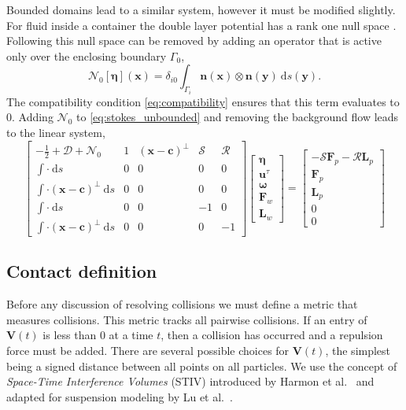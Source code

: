 \documentclass[preprint, 10pt]{elsarticle}
\begin{document}
Bounded domains lead to a similar system, however it must be modified slightly. For fluid inside a container the double layer potential has a rank one null space \cite{Ladyzhenskaya1963}. Following \cite{Power1993} this null space can be removed by adding an operator that is active only over the enclosing boundary $\Gamma_0$,
\[ \mathcal{N}_0[\pmb{\eta}](\mathbf{x}) = \delta_{i0} \int_{\Gamma_i}\mathbf{n}(\mathbf{x})\otimes\mathbf{n}(\mathbf{y})~\text{d}s(\mathbf{y}).\]
The compatibility condition \eqref{eq:compatibility} ensures that this term evaluates to 0. Adding $\mathcal{N}_0$ to \eqref{eq:stokes_unbounded} and removing the background flow leads to the linear system,
\begin{equation}\label{eq:stokes_bounded} \begin{bmatrix} -\frac{1}{2} + \mathcal{D} + \mathcal{N}_0 & 1 & (\mathbf{x}-\mathbf{c})^\perp & \mathcal{S} & \mathcal{R}\\
		\int \cdot~ \text{d}s & 0 & 0 & 0 & 0\\
		\int\cdot(\mathbf{x}-\mathbf{c})^\perp~\text{d}s & 0 & 0 & 0 & 0\\
		\int \cdot~ \text{d}s & 0 & 0 & - 1 & 0\\
		\int\cdot(\mathbf{x}-\mathbf{c})^\perp~\text{d}s & 0 & 0 & 0 & -1\end{bmatrix}
\begin{bmatrix}
	\pmb{\eta}\\\mathbf{u}^\tau \\ \pmb{\omega} \\ \mathbf{F}_w \\\mathbf{ L}_w
\end{bmatrix}
=
\begin{bmatrix}
	 - \mathcal{S}\mathbf{F}_p - \mathcal{R}\mathbf{L}_p\\
	\mathbf{F}_p\\
	\mathbf{L}_p\\
	0\\
	0
\end{bmatrix}
\end{equation}

\subsection{Contact definition}

Before any discussion of resolving collisions we must define a metric that measures collisions. This metric tracks all pairwise collisions. If an entry of $\mathbf{V}(t)$ is less than 0 at a time $t$, then a collision has occurred and a repulsion force must be added. There are several possible choices for $\mathbf{V}(t)$, the simplest being a signed distance between all points on all particles. We use the concept of \textit{Space-Time Interference Volumes} (STIV) introduced by Harmon et al.~\cite{Harmon2011} and adapted for suspension modeling by Lu et al.~\cite{Lu2017}. 
\end{document}
